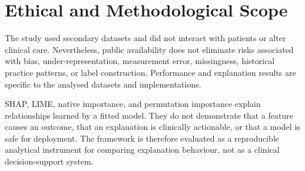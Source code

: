 \section{Ethical and Methodological Scope}

The study used secondary datasets and did not interact with patients or alter clinical care. Nevertheless, public availability does not eliminate risks associated with bias, under-representation, measurement error, missingness, historical practice patterns, or label construction. Performance and explanation results are specific to the analysed datasets and implementations.

SHAP, LIME, native importance, and permutation importance explain relationships learned by a fitted model. They do not demonstrate that a feature causes an outcome, that an explanation is clinically actionable, or that a model is safe for deployment. The framework is therefore evaluated as a reproducible analytical instrument for comparing explanation behaviour, not as a clinical decision-support system.
